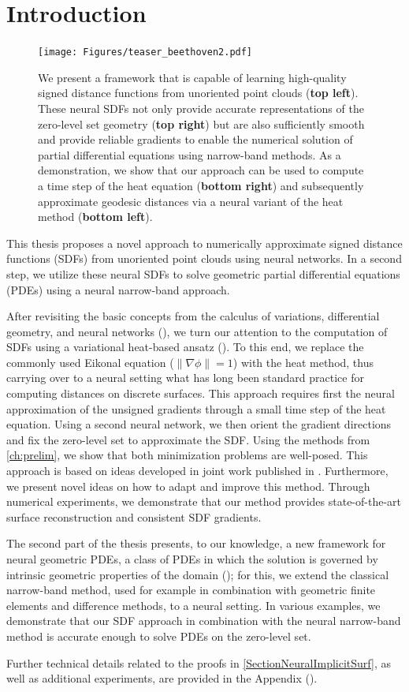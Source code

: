 \documentclass[12pt,openany]{book}
\theoremstyle{plainnormal}
\theoremstyle{remark}
\begin{document}
\section{Introduction}
\begin{figure}
    \centering
    \texttt{[image: Figures/teaser\_beethoven2.pdf]}
    \caption{We present a framework that is capable of learning high-quality signed distance functions from unoriented point clouds (\textbf{top left}). These neural SDFs not only provide accurate representations of the zero-level set geometry (\textbf{top right}) but are also sufficiently smooth and provide reliable gradients to enable the numerical solution of partial differential equations using narrow-band methods. As a demonstration, we show that our approach can be used to compute a time step of the heat equation (\textbf{bottom right}) and subsequently approximate geodesic distances via a neural variant of the heat method (\textbf{bottom left}). }
    \label{teaser}
\end{figure}
This thesis proposes a novel approach to numerically approximate signed distance functions (SDFs) from unoriented point clouds using neural networks. In a second step, we utilize these neural SDFs to solve geometric partial differential equations (PDEs) using a neural narrow-band approach.\par
After revisiting the basic concepts from the calculus of variations, differential geometry, and neural networks (), we turn our attention to the computation of SDFs using a variational heat-based ansatz (). To this end, we replace the commonly used Eikonal equation ($\|\nabla \phi\| = 1$) with the heat method, thus carrying over to a neural setting what has long been standard practice for computing distances on discrete surfaces. This approach requires first the neural approximation of the unsigned gradients through a small time step of the heat equation. Using a second neural network, we then orient the gradient directions and fix the zero-level set to approximate the SDF. Using the methods from \cref{ch:prelim}, we show that both minimization problems are well-posed. This approach is based on ideas developed in joint work published in \cite{weidemaier2025sdfsunorientedpointclouds}. Furthermore, we present novel ideas on how to adapt and improve this method. Through numerical experiments, we demonstrate that our method provides state-of-the-art surface reconstruction and consistent SDF gradients.\par
The second part of the thesis presents, to our knowledge, a new framework for neural geometric PDEs, a class of PDEs in which the solution is governed by intrinsic geometric properties of the domain (); for this, we extend the classical narrow-band method, used for example in combination with geometric finite elements and difference methods, to a neural setting. In various examples, we demonstrate that our SDF approach in combination with the neural narrow-band method is accurate enough to solve PDEs on the zero-level set.\par
Further technical details related to the proofs in \cref{SectionNeuralImplicitSurf}, as well as additional experiments, are provided in the Appendix ().
\newpage
{}
\end{document}
